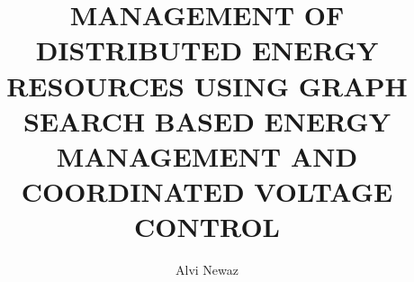 \documentclass[11pt,expanded,copyright]{fsuthesis}
\title{MANAGEMENT OF DISTRIBUTED ENERGY RESOURCES USING GRAPH SEARCH BASED ENERGY MANAGEMENT AND COORDINATED VOLTAGE CONTROL}
\author{Alvi Newaz}
\begin{document}
\frontmatter
\maketitle
\makecommitteepage



\tableofcontents
\listoftables
\listoffigures


\end{document}
